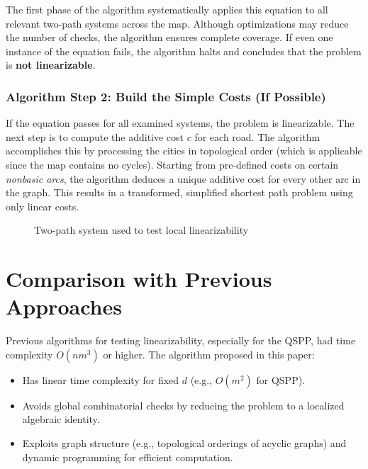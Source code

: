 \documentclass[12pt]{article}
\begin{document}
The first phase of the algorithm systematically applies this equation to all relevant two-path systems across the map. Although optimizations may reduce the number of checks, the algorithm ensures complete coverage. If even one instance of the equation fails, the algorithm halts and concludes that the problem is \textbf{not linearizable}.

\subsubsection*{Algorithm Step 2: Build the Simple Costs (If Possible)}

If the equation passes for all examined systems, the problem is linearizable. The next step is to compute the additive cost $c$ for each road. The algorithm accomplishes this by processing the cities in topological order (which is applicable since the map contains no cycles). Starting from pre-defined costs on certain \textit{nonbasic arcs}, the algorithm deduces a unique additive cost for every other arc in the graph. This results in a transformed, simplified shortest path problem using only linear costs.

\begin{figure}[h]
\centering
{}
\caption{Two-path system used to test local linearizability}
\end{figure}

\section{Comparison with Previous Approaches}

Previous algorithms for testing linearizability, especially for the QSPP, had time complexity $O(nm^3)$ or higher. The algorithm proposed in this paper:
\begin{itemize}[itemsep=2pt]
    \item Has linear time complexity for fixed $d$ (e.g., $O(m^2)$ for QSPP).
    \item Avoids global combinatorial checks by reducing the problem to a localized algebraic identity.
    \item Exploits graph structure (e.g., topological orderings of acyclic graphs) and dynamic programming for efficient computation.
\end{itemize}
\end{document}
